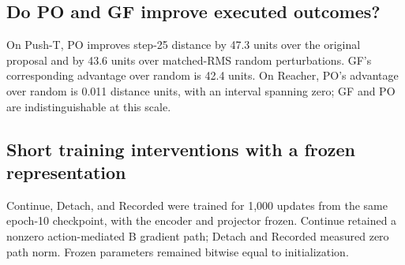 \begin{table}[t]
 \centering\small
 
 \caption{At $N=64$, positive random-minus-B distance improvement favors B. Regret is B's distance above the best physical outcome in the sampled pool; units are task-specific.}
 \label{tab:reference_phase16_selection_distance}
\end{table}

\subsection{Do PO and GF improve executed outcomes?}
On Push-T, PO improves step-25 distance by 47.3 units over the original proposal and by 43.6 units over matched-RMS random perturbations. GF's corresponding advantage over random is 42.4 units. On Reacher, PO's advantage over random is 0.011 distance units, with an interval spanning zero; GF and PO are indistinguishable at this scale.

\begin{table}[t]
 \centering\small
 
 \caption{Legacy-cohort local direction test. Positive distance improvement and positive guided-minus-random effects favor guidance. Candidate 0 and 1 are averaged within state; intervals and the Holm family use states as the sampling unit. The A/B forward and B backward counts describe work per guided branch.}
 \label{tab:reference_phase16_guidance}
\end{table}

\subsection{Short training interventions with a frozen representation}
Continue, Detach, and Recorded were trained for 1,000 updates from the same epoch-10 checkpoint, with the encoder and projector frozen. Continue retained a nonzero action-mediated B gradient path; Detach and Recorded measured zero path norm. Frozen parameters remained bitwise equal to initialization.

\begin{table}[t]
 \centering\small
 
 \caption{Confirmation-cohort success after short training interventions. Each arm uses the same 100 starts and two inference seeds; these are not independent training seeds.}
 \label{tab:reference_phase16_training_success}
\end{table}

